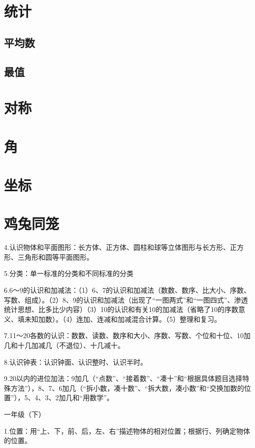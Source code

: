 \section{统计}

\subsection{平均数}

\subsection{最值}

\section{对称}

\section{角}

\section{坐标}

\section{鸡兔同笼}

4.认识物体和平面图形：长方体、正方体、圆柱和球等立体图形与长方形、正方形、三角形和圆等平面图形。

5.分类：单一标准的分类和不同标准的分类

6.6～9的认识和加减法：（1）6、7的认识和加减法（数数、数序、比大小、序数、写数、组成）。（2）8、9的认识和加减法（出现了“一图两式”和“一图四式”、渗透统计思想、比多比少内容）（3）10的认识和有关10的加减法（省略了10的序数意义、填未知加数）。（4）连加、连减和加减混合计算。（5）整理和复习。

7.11～20各数的认识：数数、读数、数序和大小、序数、写数、个位和十位、10加几和十几加减几（不退位）、十几减十。

8.认识钟表：认识钟面、认识整时、认识半时。

9.20以内的进位加法：9加几（“点数”、“接着数”、“凑十”和“根据具体题目选择特殊方法”），8、7、6加几（“拆小数，凑十数”、“拆大数，凑小数”和“交换加数的位置”），5、4、3、2加几和“用数学”。

一年级（下）

1.位置：用“上、下，前、后，左、右”描述物体的相对位置；根据行、列确定物体的位置。

